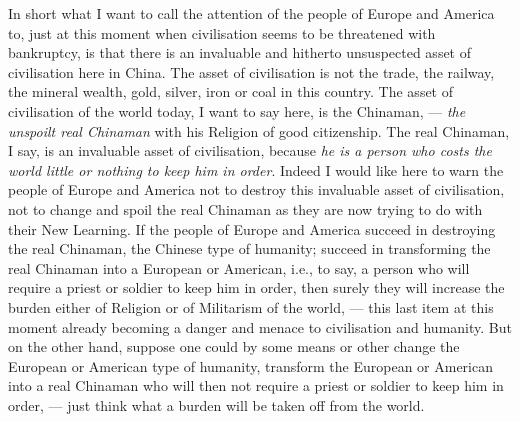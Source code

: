 In short what I want to call the attention of the people of Europe and America to, just at this moment when civilisation seems to be threatened with bankruptcy, is that there is an invaluable and hitherto unsuspected asset of civilisation here in China.
The asset of civilisation is not the trade, the railway, the mineral wealth, gold, silver, iron or coal in this country.
The asset of civilisation of the world today, I want to say here, is the Chinaman, --- \emph{the unspoilt real Chinaman} with his Religion of good citizenship. The real Chinaman, I say, is an invaluable asset of civilisation, because \emph{he is a person who costs the world little or nothing to keep him in order}.
Indeed I would like here to warn the people of Europe and America not to destroy this invaluable asset of civilisation, not to change and spoil the real Chinaman as they are now trying to do with their New Learning.
If the people of Europe and America succeed in destroying the real Chinaman, the Chinese type of humanity; succeed in transforming the real Chinaman into a European or American, i.e., to say, a person who will require a priest or soldier to keep him in order, then surely they will increase the burden either of Religion or of Militarism of the world, --- this last item at this moment already becoming a danger and menace to civilisation and humanity.
But on the other hand, suppose one could by some means or other change the European or American type of humanity, transform the European or American into a real Chinaman who will then not require a priest or soldier to keep him in order, --- just think what a burden will be taken off from the world.

